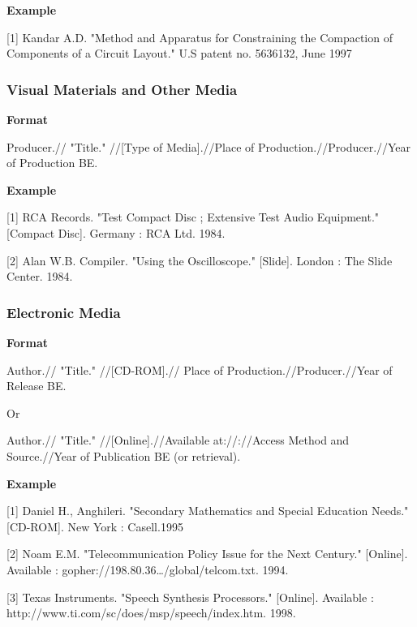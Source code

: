 \textbf{Example}

[1] Kandar A.D. "Method and Apparatus for Constraining the Compaction of Components of a Circuit Layout." U.S patent no. 5636132, June 1997

\subsubsection{Visual Materials and Other Media}

\textbf{Format}

Producer.// "Title." //[Type of Media].//Place of Production.//Producer.//Year of Production BE.

\textbf{Example}

[1] RCA Records. "Test Compact Disc ; Extensive Test Audio Equipment." [Compact Disc]. Germany : RCA Ltd. 1984.

[2] Alan W.B. Compiler. "Using the Oscilloscope." [Slide]. London : The Slide Center. 1984.

\subsubsection{Electronic Media}

\textbf{Format}

Author.// "Title." //[CD-ROM].// Place of Production.//Producer.//Year of Release BE.

Or

Author.// "Title." //[Online].//Available at://://Access Method and Source.//Year of Publication BE (or retrieval).

\textbf{Example}

[1] Daniel H., Anghileri. "Secondary Mathematics and Special Education Needs." [CD-ROM]. New York : Casell.1995

[2] Noam E.M. "Telecommunication Policy Issue for the Next Century." [Online]. Available : gopher://198.80.36…/global/telcom.txt. 1994.

[3] Texas Instruments. "Speech Synthesis Processors." [Online]. Available : http://www.ti.com/sc/does/msp/speech/index.htm. 1998.